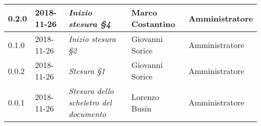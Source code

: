 \begin{longtable}{C{2cm}|C{2.5cm}|C{4.5cm}|C{2.5cm}|C{3cm}}
		0.2.0 & 2018-11-26 & \emph{Inizio stesura §4} & Marco Costantino & Amministratore  \\
		\hline
		
		0.1.0 & 2018-11-26 & \emph{Inizio stesura §2} & Giovanni Sorice & Amministratore \\
		\hline
		
		0.0.2 & 2018-11-26 & \emph{Stesura §1} & Giovanni Sorice & Amministratore  \\
		\hline
		
		0.0.1 & 2018-11-26 & \emph{Stesura dello scheletro del documento} & Lorenzo Busin & Amministratore \\
	
	
\end{longtable}


\clearpage